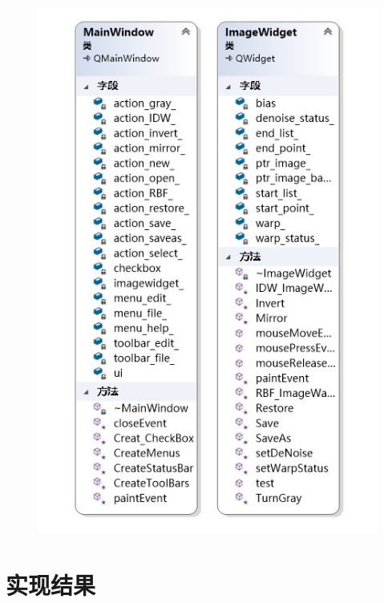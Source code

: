 \documentclass{article}
\begin{document}
	\begin{figure}[htb]
		\begin{center}
			\includegraphics[width=6in]{class2.jpg}
		\end{center}
	\end{figure}
	\clearpage
	\section{实现结果}
\end{document}
